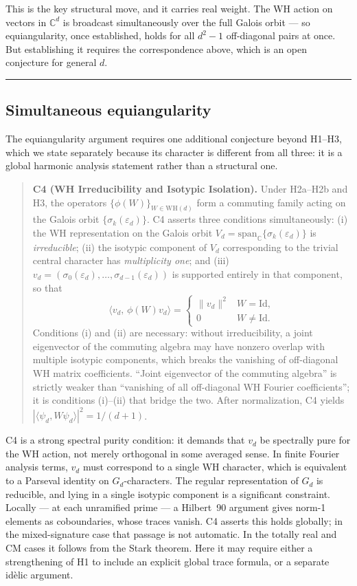 \documentclass[12pt]{article}
\theoremstyle{plain}
\theoremstyle{definition}
\theoremstyle{remark}
\newcommand{\WH}{\mathrm{WH}}
\newcommand{\eps}{\varepsilon}
\newcommand{\bC}{\mathbb{C}}
\begin{document}
This is the key structural move, and it carries real weight. The WH action on vectors in $\bC^d$ is broadcast simultaneously over the full Galois orbit — so equiangularity, once established, holds for all $d^2 - 1$ off-diagonal pairs at once. But establishing it requires the correspondence above, which is an open conjecture for general $d$.

\medskip\noindent\rule{\linewidth}{0.3pt}\medskip

\subsection{Simultaneous equiangularity}

The equiangularity argument requires one additional conjecture beyond H1--H3, which we state separately because its character is different from all three: it is a global harmonic analysis statement rather than a structural one.

\begin{quote}
\textbf{C4 (WH Irreducibility and Isotypic Isolation).} Under H2a--H2b and H3, the operators $\{\phi(W)\}_{W \in \WH(d)}$ form a commuting family acting on the Galois orbit $\{\sigma_k(\eps_d)\}$. C4 asserts three conditions simultaneously: (i) the WH representation on the Galois orbit $V_d = \mathrm{span}_\bC\{\sigma_k(\eps_d)\}$ is \emph{irreducible}; (ii) the isotypic component of $V_d$ corresponding to the trivial central character has \emph{multiplicity one}; and (iii) $v_d = (\sigma_0(\eps_d), \ldots, \sigma_{d-1}(\eps_d))$ is supported entirely in that component, so that
\[
  \langle v_d,\, \phi(W) v_d \rangle = \begin{cases} \|v_d\|^2 & W = \mathrm{Id}, \\ 0 & W \neq \mathrm{Id}. \end{cases}
\]
Conditions (i) and (ii) are necessary: without irreducibility, a joint eigenvector of the commuting algebra may have nonzero overlap with multiple isotypic components, which breaks the vanishing of off-diagonal WH matrix coefficients. ``Joint eigenvector of the commuting algebra'' is strictly weaker than ``vanishing of all off-diagonal WH Fourier coefficients''; it is conditions (i)--(ii) that bridge the two. After normalization, C4 yields $|\langle \psi_d, W\psi_d\rangle|^2 = 1/(d+1)$.

\end{quote}

C4 is a strong spectral purity condition: it demands that $v_d$ be spectrally pure for the WH action, not merely orthogonal in some averaged sense. In finite Fourier analysis terms, $v_d$ must correspond to a single WH character, which is equivalent to a Parseval identity on $G_d$-characters. The regular representation of $G_d$ is reducible, and lying in a single isotypic component is a significant constraint. Locally — at each unramified prime — a Hilbert~90 argument gives norm-1 elements as coboundaries, whose traces vanish. C4 asserts this holds globally; in the mixed-signature case that passage is not automatic. In the totally real and CM cases it follows from the Stark theorem. Here it may require either a strengthening of H1 to include an explicit global trace formula, or a separate id\`{e}lic argument.
\end{document}
